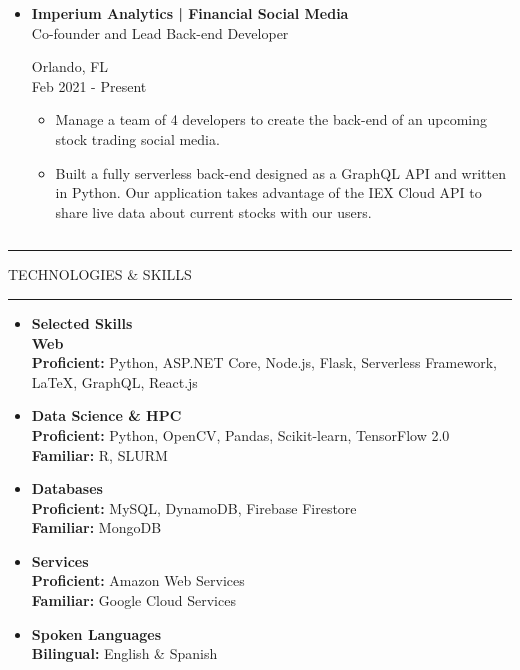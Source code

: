 \documentclass{article}
\newcommand{\makeminipage}[4]{
    \begin{minipage}[c]{.7\linewidth} 
        \flushleft #1 \\ #2
    \end{minipage} \hfill
    \begin{minipage}[c]{.29\linewidth}
        \flushright #3 \\ #4
    \end{minipage}
}
\newcommand{\makesection}[1]{\hrule\vskip1mm\uppercase{#1}\vskip1mm\hrule}
\begin{document}
\begin{minipage}[t]{.68\linewidth}
\begin{itemize}[leftmargin=.35cm]
        \item \makeminipage
            {\textbf{Imperium Analytics | Financial Social Media}}
            {Co-founder and Lead Back-end Developer}
            {Orlando, FL}
            {Feb 2021 - Present}
            \vspace*{-1.5mm}
            \raggedright
            \begin{itemize}[leftmargin=.35cm]
                \item Manage a team of 4 developers to create the back-end of an upcoming stock trading social media.
                \item Built a fully serverless back-end designed as a GraphQL API and written in Python. Our application takes advantage of the IEX Cloud API to share live data about current stocks with our users.
            \end{itemize}
    \end{itemize}
\end{minipage}
\begin{minipage}[t]{.01\linewidth}$ $\end{minipage}
\begin{minipage}[t]{.3\linewidth}
    \makesection{Technologies \& Skills}
    \raggedright

    \begin{itemize}[leftmargin=.35cm]
        \item \textbf{Selected Skills} \\
        \textbf{Web} \\
        \textbf{Proficient:} Python, ASP.NET Core, Node.js, Flask, Serverless Framework, \LaTeX, GraphQL, React.js
        \item \textbf{Data Science \& HPC} \\
        \textbf{Proficient:} Python, OpenCV, Pandas, Scikit-learn, TensorFlow 2.0 \\
        \textbf{Familiar:} R, SLURM
        \item \textbf{Databases} \\
        \textbf{Proficient:} MySQL, DynamoDB, Firebase Firestore \\
        \textbf{Familiar:} MongoDB
        \item \textbf{Services} \\
        \textbf{Proficient:} Amazon Web Services \\
        \textbf{Familiar:} Google Cloud Services
        \item \textbf{Spoken Languages} \\
        \textbf{Bilingual:} English \& Spanish
    \end{itemize}
\end{minipage}
\vspace*{2.5mm}
\end{document}
